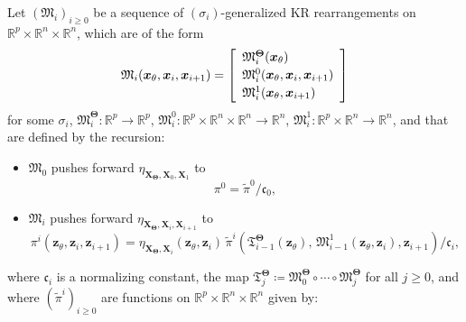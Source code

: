 \documentclass[twoside,11pt]{article}
\newcommand{\re}{\mathbb{R}}
\newcommand{\ra}{\rightarrow}
\newcommand{\Xb}{\boldsymbol{X}}
\newcommand{\xb}{\boldsymbol{x}}
\newcommand{\Zb}{\boldsymbol{Z}}
\newcommand{\zb}{\boldsymbol{z}}
\newcommand{\vhyp}{\boldsymbol{\Theta}}
\newcommand{\vhyps}{\theta}
\newcommand{\dhyp}{p}
\newcommand{\submap}{\mathfrak{M}}
\begin{document}
\begin{theorem} \label{thm:decompJoint}
Let $(\submap_i)_{i \ge 0}$ be a sequence of $(\sigma_i)$-generalized 
KR rearrangements on $\re^{\dhyp} \times \re^n \times \re^n$, which are of the
form
\begin{equation}   \label{eq:thm:decompJoint:genTriMap} 
\submap_i( \xb_{\vhyps}, \xb_i , \xb_{i+1} ) = \left[\begin{array}{l}
\submap_i^{\vhyp}( \xb_{\vhyps} ) \\[\spacinglines]
\submap_i^0( \xb_{\vhyps}, \xb_i , \xb_{i+1} ) \\[\spacinglines] 
\submap_i^1( \xb_{\vhyps}, \xb_{i+1})
\end{array}\right] %
\end{equation}
for some $\sigma_i$, $\submap_i^{\vhyp} : \re^{\dhyp} \ra \re^\dhyp$,
$\submap_i^0 : \re^{\dhyp} \times \re^n \times \re^n \ra \re^n$, 
$\submap_i^1 : \re^{\dhyp} \times \re^{n} \ra \re^n$, and
that are defined by the recursion:
  \begin{itemize}[label={--}]
    \item  
    $\submap_0$ pushes forward 
    $\eta_{\Xb_{\vhyp},\Xb_0,\Xb_{1}}$ to
    \begin{equation} \label{eq:target_stepmap_0}
    \pi^0 = \widetilde{\pi}^0/ \mathfrak{c}_0,
    \end{equation}
    \item 
    $\submap_i$
    pushes forward $\eta_{\Xb_{\vhyp},\Xb_i,\Xb_{i+1}}$ to
    \begin{equation} \label{eq:target_stepmap}
    \pi^i(\zb_{\vhyps},\zb_i, \zb_{i+1}) =
    \eta_{\Xb_{\vhyp},\Xb_i}(\zb_{\vhyps},\zb_i) \, 
    \widetilde{\pi}^i(\mathfrak{T}^{\vhyp}_{i-1}(\zb_{\vhyps}),
                \,
    \submap_{i-1}^1(\zb_{\vhyps},\zb_i), \zb_{i+1})/\mathfrak{c}_i,
    \end{equation}    
  \end{itemize}
where 
$\mathfrak{c}_i$ is a normalizing constant,
%
%
the map
$\mathfrak{T}^{\vhyp}_{j} \coloneqq \submap_{0}^{\vhyp} \circ \cdots
\circ \submap_{j}^{\vhyp}$ for all $j \ge 0$, and where
$(\widetilde{\pi}^i)_{i \ge 0}$ 
%
are
functions on 
$\re^{\dhyp} \times \re^{n} \times \re^{n} $ given by: 
\end{theorem}
\end{document}
